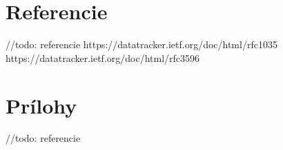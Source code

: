 \documentclass[a4paper, 11pt]{article}
\begin{document}
	\section{Referencie}
	//todo: referencie
	https://datatracker.ietf.org/doc/html/rfc1035
	https://datatracker.ietf.org/doc/html/rfc3596

	\section{Prílohy}
	//todo: referencie
\end{document}
